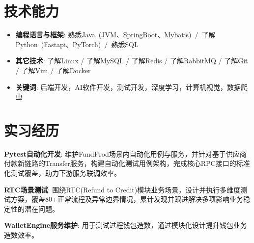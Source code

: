 \documentclass{resume}
\begin{document}
\section{技术能力}
\begin{itemize}[parsep=0.2ex]

  \item \textbf{编程语言与框架}: 熟悉Java~(JVM、SpringBoot、Mybatis)~/~了解Python~(Fastapi、PyTorch)~/~熟悉SQL~
  \vspace{0.1cm}
  \item \textbf{其它技术}: 了解Linux / 了解MySQL / 了解Redis / 了解RabbitMQ / 了解Git / 了解Vim / 了解Docker 
  \vspace{0.1cm}
  \item \textbf{关键词}: 后端开发，AI软件开发，测试开发，深度学习，计算机视觉，数据爬虫

\end{itemize}

\section{实习经历}
  \vspace{0.1cm}
\begin{itemize}[parsep=0.2ex]
  {\small 
  \item \textbf{Pytest自动化开发}: 维护FundProd场景内自动化用例与服务，并针对基于供应商付款新链路的Transfer服务，构建自动化测试用例架构，完成核心RPC接口的标准化测试覆盖，助力下游服务联调效率。   
  \vspace{0.1cm}
  \item \textbf{RTC场景测试}: 围绕RTC(Refund to Credit)模块业务场景，设计并执行多维度测试方案，覆盖80+正常流程及异常边界情况，累计发现并跟进解决多项影响业务稳定性的潜在问题。}
  \vspace{0.1cm}
  \item \textbf{WalletEngine服务维护}: 用于测试过程钱包造数，通过模块化设计提升钱包业务造数效率。
\end{itemize}

\end{document}
